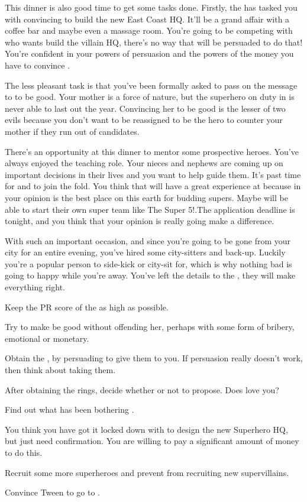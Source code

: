 \documentclass[char]{LRSguildcamp1}
\begin{document}
This dinner is also good time to get some tasks done. Firstly, the \cHeroLeague{} has tasked you with convincing \cArchitect{} to build the new East Coast HQ. It'll be a grand affair with a coffee bar and maybe even a massage room. You're going to be competing with \cOldest{} who wants \cArchitect{} build the villain HQ, there's no way that \cArchitect{} will be persuaded to do that! You're confident in your powers of persuasion and the powers of the money you have to convince \cArchitect{}. 

The less pleasant task is that you've been formally asked to pass on the message to \cGrandma{\parent} to be good. Your mother is a force of nature, but the superhero on duty in \pCityGrandma{} is never able to last out the year. Convincing her to be good is the lesser of two evils because you don't want to be reassigned to be the hero to counter your mother if they run out of candidates. 

There's an opportunity at this dinner to mentor some prospective heroes. You've always enjoyed the teaching role. Your nieces and nephews are coming up on important decisions in their lives and you want to help guide them. It's past time for \cGrad{} and \cTeen{} to join the fold. You think that \cTween{} will have a great experience at \pSuperSchool{} because in your opinion \pSuperSchool{} is the best place on this earth for budding supers.  Maybe \cTween{} will be able to start their own super team like The Super 5!.The application deadline is tonight, and you think that your opinion is really going make a difference. 

With such an important occasion, and since you're going to be gone from your city for an entire evening, you've hired some city-sitters and back-up. Luckily you're a popular person to side-kick or city-sit for, which is why nothing bad is going to happy while you're away. You've left the details to the \cHeroLeague{}, they will make everything right. 

\begin{itemz}[Goals]
	\item Keep the PR score of the \cHeroLeague{} as high as possible.
	\item Try to make \cGrandma{} be good without offending her, perhaps with some form of bribery, emotional or monetary. 
	\item Obtain the \iEngagementRings{}, by persuading \cGrandma{} to give them to you. If persuasion really doesn't work, then think about taking them. 
	\item After obtaining the rings, decide whether or not to propose. Does \cYS{} love you?  
	\item Find out what has been bothering \cYS{}. 
	\item You think you have got it locked down with \cArchitect{} to design the new Superhero HQ, but just need confirmation. You are willing to pay a significant amount of money to do this.  
	\item  Recruit some more superheroes and prevent \cOldest{} from recruiting new supervillains.
	\item Convince Tween to go to \pSuperSchool{}. 
	
\end{itemz}
\end{document}
